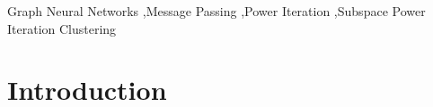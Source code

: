 \documentclass[preprint,11pt]{elsarticle}
\begin{document}
\begin{frontmatter}
\begin{abstract}
\end{abstract}



\begin{keyword}
Graph Neural Networks \sep Message Passing \sep Power Iteration \sep Subspace Power Iteration Clustering

\end{keyword}

\end{frontmatter}


\section{Introduction}
\end{document}
